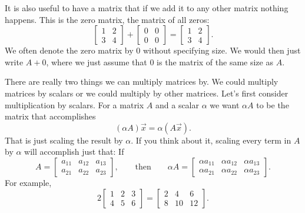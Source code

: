 It is also useful to have a matrix that if we add it to any other matrix
nothing happens.  This is the zero matrix, the matrix of all zeros:
\begin{equation*}
\begin{bmatrix}
1 & 2 \\
3 & 4
\end{bmatrix}
+
\begin{bmatrix}
0 & 0 \\
0 & 0
\end{bmatrix}
=
\begin{bmatrix}
1 & 2 \\
3 & 4
\end{bmatrix} .
\end{equation*}
We often denote the zero matrix
by $0$ without specifying size.  We would then just write $A + 0$, where we
just assume that $0$ is the matrix of the same size as $A$.

\medskip

There are really two things we can multiply matrices by.  We could multiply
matrices by scalars or we could multiply by other matrices.  Let's first
consider multiplication by scalars.
For a matrix $A$ and a scalar $\alpha$ we want $\alpha A$ to be the matrix
that accomplishes
\begin{equation*}
(\alpha A) \vec{x} = \alpha (A \vec{x}) .
\end{equation*}
That is just scaling the result by $\alpha$.  If you think about it,
scaling every term in $A$ by $\alpha$ will accomplish just that:
If
\begin{equation*}
A = 
\begin{bmatrix}
a_{11} & a_{12} & a_{13}  \\
a_{21} & a_{22} & a_{23}
\end{bmatrix},
\qquad\text{then} \qquad
\alpha A = 
\begin{bmatrix}
\alpha a_{11} & \alpha a_{12} & \alpha a_{13}  \\
\alpha a_{21} & \alpha a_{22} & \alpha a_{23}
\end{bmatrix} .
\end{equation*}
For example,
\begin{equation*}
2
\begin{bmatrix}
1 & 2 & 3 \\
4 & 5 & 6
\end{bmatrix} =
\begin{bmatrix}
2 & 4 & 6 \\
8 & 10 & 12
\end{bmatrix} .
\end{equation*}

